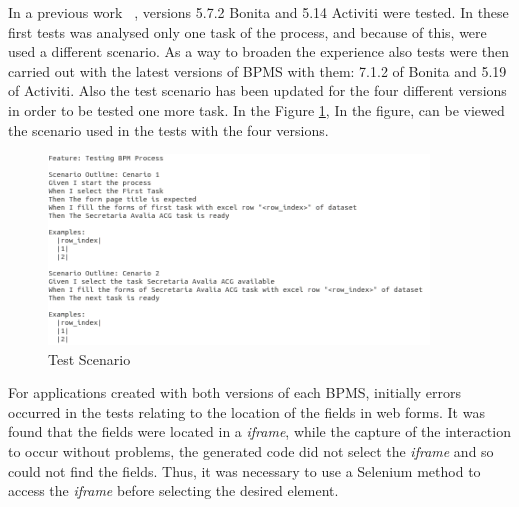\documentclass[runningheads,a4paper]{llncs}
\begin{document}



In a previous work ~\cite{sbqs2015}, versions 5.7.2 Bonita and 5.14 Activiti were tested. In these first tests was analysed only one task of the process, and because of this, were used a different scenario. As a way to broaden the experience also tests were then carried out with the latest versions of BPMS with them: 7.1.2 of Bonita and 5.19 of  Activiti. Also the test scenario has been updated for the four different versions in order to be tested one more task. In the Figure \ref{fig:cenario2}, In the figure, can be viewed the scenario used in the tests with the four versions.
\begin{figure}[ht]
\centering
\includegraphics[width=0.9\textwidth]{figuras/cenario2.png}
\caption{Test Scenario}
\label{fig:cenario2}
\end{figure}


For applications created with both versions of each BPMS, initially errors occurred in the tests relating to the location of the fields in web forms. It was found that the fields were located in a \emph{iframe}, while the capture of the interaction to occur without problems, the generated code did not select the \emph{iframe} and so could not find the fields. Thus, it was necessary to use a Selenium method to access the \emph{iframe} before selecting the desired element.
\end{document}
